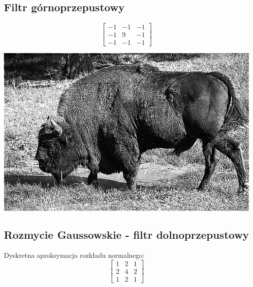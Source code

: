 \documentclass{article}
\begin{document}
	\subsection{Filtr górnoprzepustowy}
	\begin{equation}
	\begin{bmatrix}
	-1 & -1 & -1 \\
	-1 & 9 & -1 \\
	-1 & -1 & -1 
	\end{bmatrix}
	\end{equation}
	\begin{center}
		\includegraphics[width=\linewidth]{../../lab03/bison_high-pass.png}
	\end{center}

	\subsection{Rozmycie Gaussowskie - filtr dolnoprzepustowy}
	Dyskretna aproksymacja rozkładu normalnego:
	\begin{equation}
		\left[
			\begin{matrix}
				1 & 2 & 1 \\
				2 & 4 & 2 \\
				1 & 2 & 1 
			\end{matrix}
		\right]
	\end{equation}
	
\end{document}
